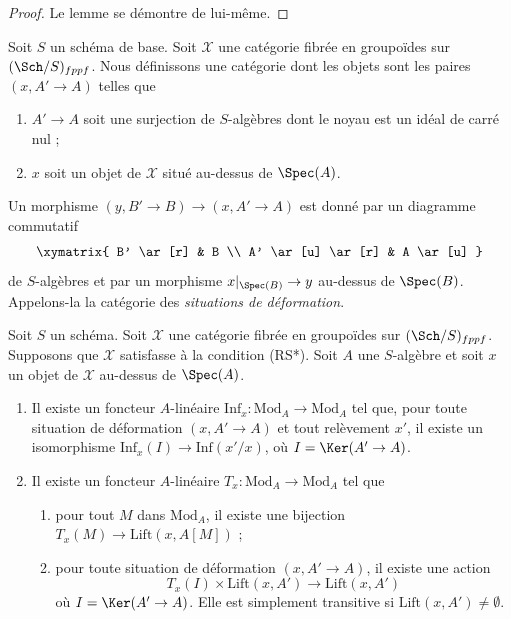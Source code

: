 \begin{proof}
Le lemme se démontre de lui-même.
\end{proof}

\noindent
Soit $S$ un schéma de base. Soit $\mathcal{X}$ une catégorie fibrée en
groupoïdes sur $(\Sch/S)_{fppf}$. Nous définissons une catégorie dont les
objets sont les paires $(x, A' \to A)$ telles que
\begin{enumerate}
\item $A' \to A$ soit une surjection de $S$-algèbres dont le noyau est un
idéal de carré nul ;
\item $x$ soit un objet de $\mathcal{X}$ situé au-dessus de $\Spec(A)$.
\end{enumerate}
Un morphisme $(y, B' \to B) \to (x, A' \to A)$ est donné par un diagramme
commutatif
$$
\xymatrix{
B' \ar[r] & B \\
A' \ar[u] \ar[r] & A \ar[u]
}
$$
de $S$-algèbres et par un morphisme $x|_{\Spec(B)} \to y$ au-dessus de
$\Spec(B)$. Appelons-la la catégorie des {\it situations de déformation}.

\begin{lemma}
\label{lemma-properties-lift-RS-star}
Soit $S$ un schéma. Soit $\mathcal{X}$ une catégorie fibrée en groupoïdes sur
$(\Sch/S)_{fppf}$. Supposons que $\mathcal{X}$ satisfasse à la condition
(RS*). Soit $A$ une $S$-algèbre et soit $x$ un objet de $\mathcal{X}$
au-dessus de $\Spec(A)$.
\begin{enumerate}
\item Il existe un foncteur $A$-linéaire
$\text{Inf}_x : \text{Mod}_A \to \text{Mod}_A$
tel que, pour toute situation de déformation $(x, A' \to A)$ et tout
relèvement $x'$, il existe un isomorphisme
$\text{Inf}_x(I) \to \text{Inf}(x'/x)$, où $I = \Ker(A' \to A)$.
\item Il existe un foncteur $A$-linéaire
$T_x : \text{Mod}_A \to \text{Mod}_A$
tel que
\begin{enumerate}
\item pour tout $M$ dans $\text{Mod}_A$, il existe une bijection
$T_x(M) \to \text{Lift}(x, A[M])$ ;
\item pour toute situation de déformation $(x, A' \to A)$, il existe une
action
$$
T_x(I) \times \text{Lift}(x, A') \to \text{Lift}(x, A')
$$
où $I = \Ker(A' \to A)$. Elle est simplement transitive si
$\text{Lift}(x, A') \not = \emptyset$.
\end{enumerate}
\end{enumerate}
\end{lemma}

